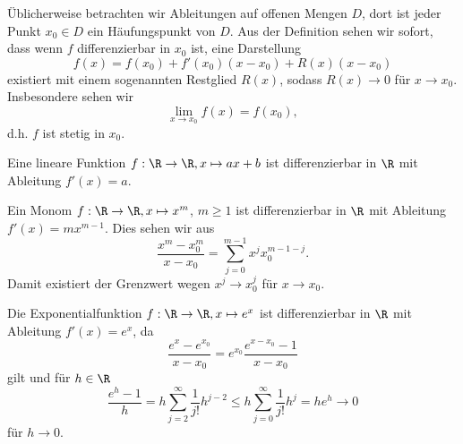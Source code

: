 \documentclass[letterpaper,10pt,english]{jupyterBook}
\begin{document}
Üblicherweise betrachten wir Ableitungen auf offenen Mengen \(D\), dort ist jeder Punkt \(x_0 \in D\) ein Häufungspunkt von \(D\).
Aus der Definition sehen wir sofort, dass wenn \(f\) differenzierbar in \(x_0\) ist, eine Darstellung
\begin{equation*}
 f(x) = f(x_0) + f'(x_0)(x-x_0) +R(x)(x-x_0)
\end{equation*}
existiert mit einem sogenannten Restglied \(R(x)\), sodass \(R(x) \rightarrow 0 \) für \(x \rightarrow x_0\). Insbesondere sehen wir
\begin{equation*}
 \lim_{x \rightarrow x_0} f(x) = f(x_0),
\end{equation*}
d.h. \(f\) ist stetig in \(x_0\).
\label{differential/differential:example-1}
\begin{example}{}{}



Eine lineare Funktion \(f: \R \rightarrow \R, x \mapsto a x + b\) ist differenzierbar in \(\R\) mit Ableitung \(f'(x) = a\).
\end{example}
\label{differential/differential:example-2}
\begin{example}{}{}



Ein Monom \(f: \R \rightarrow \R, x \mapsto x^m\), \(m \geq 1\) ist differenzierbar in \(\R\) mit Ableitung \(f'(x) = m x^{m-1}\). Dies sehen wir aus
\begin{equation*}
 \frac{x^m - x_0^m}{x-x_0} = \sum_{j=0}^{m-1} x^j x_0^{m-1-j} .
\end{equation*}
Damit existiert der Grenzwert wegen \(x^j \rightarrow x_0^j\) für \(x \rightarrow x_0\).
\end{example}
\label{differential/differential:example-3}
\begin{example}{}{}



Die Exponentialfunktion \(f: \R \rightarrow \R, x \mapsto e^x\) ist differenzierbar in \(\R\) mit Ableitung \(f'(x) = e^x\), da
\begin{equation*}
 \frac{e^x - e^{x_0}}{x-x_0} = e^{x_0}  \frac{e^{x-x_0}-1}{x-x_0}
\end{equation*}
gilt und für \(h \in \R\)
\begin{equation*}
 \frac{e^h - 1}h =  h \sum_{j=2}^\infty \frac{1}{j!}h^{j-2} \leq h  \sum_{j=0}^\infty \frac{1}{j!}h^{j} = h e^h \rightarrow 0
\end{equation*}
für \(h \rightarrow 0\).
\end{example}
\end{document}
